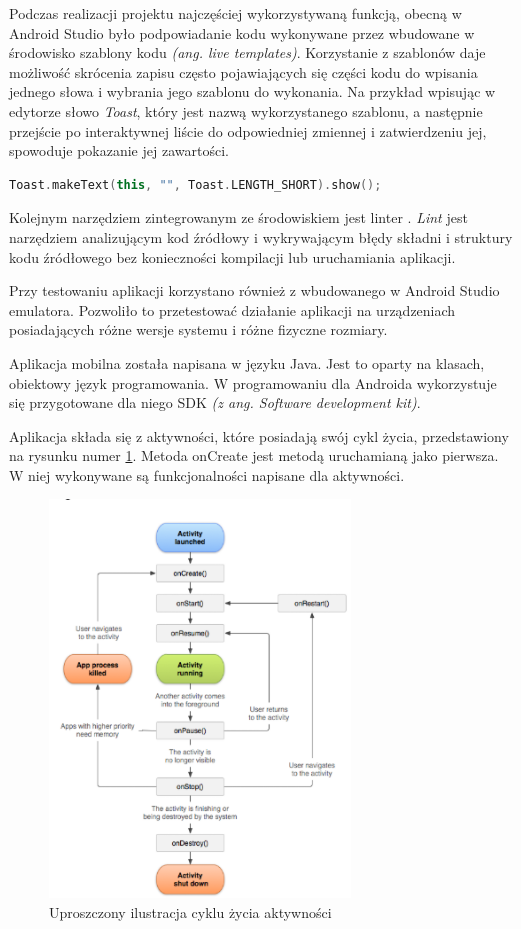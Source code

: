 \documentclass[a4paper,12pt, twoside]{article}
\begin{document}
        Podczas realizacji projektu najczęściej wykorzystywaną funkcją, obecną w Android Studio było podpowiadanie kodu wykonywane przez wbudowane w środowisko szablony kodu \textit{(ang. live templates)}. Korzystanie z szablonów daje możliwość skrócenia zapisu często pojawiających się części kodu do wpisania jednego słowa i wybrania jego szablonu do wykonania. Na przykład wpisując w edytorze słowo \textit{Toast}, który jest nazwą wykorzystanego szablonu, a następnie przejście po interaktywnej liście do odpowiedniej zmiennej i zatwierdzeniu jej, spowoduje pokazanie jej zawartości. 
    
    \begin{lstlisting}[language=C++, caption=Zawartość szablonu Toast]
Toast.makeText(this, "", Toast.LENGTH_SHORT).show();\end{lstlisting}
    
        Kolejnym narzędziem zintegrowanym ze środowiskiem jest linter \cite{lint}. \textit{Lint} jest narzędziem analizującym kod źródłowy i wykrywającym błędy składni i struktury kodu źródłowego bez konieczności kompilacji lub uruchamiania aplikacji.
    
        Przy testowaniu aplikacji korzystano również z wbudowanego w Android Studio emulatora. Pozwoliło to przetestować działanie aplikacji na urządzeniach posiadających różne wersje systemu i różne fizyczne rozmiary. 

    	Aplikacja mobilna została napisana w języku Java. Jest to oparty na klasach, obiektowy język programowania. W programowaniu dla Androida wykorzystuje się przygotowane dla niego SDK\textit{ (z ang. Software development kit)}\cite{sdk}.
    	
    	Aplikacja składa się z aktywności, które posiadają swój cykl życia, przedstawiony na rysunku numer \ref{fig:lifecycle}. Metoda onCreate jest metodą uruchamianą jako pierwsza. W niej wykonywane są funkcjonalności napisane dla aktywności.
    
    	\begin{figure}[H]
    	        \centering
    			\includegraphics[width=8cm]{images/rys6_androidlifecycle.png}
    			\caption{Uproszczony ilustracja cyklu życia aktywności \cite{lifecycle}}
                \label{fig:lifecycle}
    	\end{figure}
    	
\end{document}
